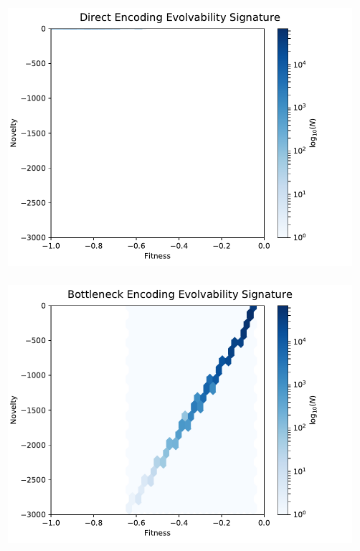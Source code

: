 \begin{figure}
        \begin{subfigure}[b]{0.33\textwidth}
                \includegraphics[width=\linewidth]{img/direct_es_scaled}
        \end{subfigure}%
        \begin{subfigure}[b]{0.33\textwidth}
                \includegraphics[width=\linewidth]{img/bottleneck_es_scaled}
        \end{subfigure}%
        \begin{subfigure}[b]{0.33\textwidth}

\end{subfigure}
\end{figure}
